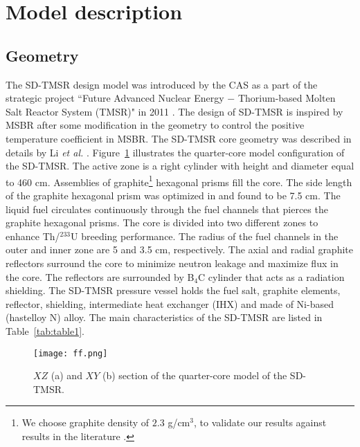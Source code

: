 \section{Model description}
\subsection{Geometry}
The \gls{SD-TMSR} design model was introduced by the \gls{CAS} as a part of  
the strategic project ``Future Advanced Nuclear Energy $-$ Thorium-based 
Molten Salt Reactor System (TMSR)" in 2011 
\cite{li_optimization_2018,jiang2012advanced,li2015analysis,li2017model}. The 
design of \gls{SD-TMSR} is inspired by \gls{MSBR} 
\cite{robertson_conceptual_1971} after some modification in the geometry to 
control the positive temperature coefficient in MSBR. The \gls{SD-TMSR} core 
geometry was described in details by Li \emph{et al.} 
\cite{li_optimization_2018}.
Figure~\ref{fig:ff} illustrates the quarter-core model configuration of the 
\gls{SD-TMSR}. The active zone is a right cylinder with height and diameter 
equal to 460 cm. Assemblies of graphite\footnote{We choose graphite density of 
$2.3$ g/cm$^3$, to validate our results against results in the literature 
\cite{li_optimization_2018,nuttin2005potential}.} hexagonal prisms fill the 
core. The side length of the graphite hexagonal prism was optimized in 
\cite{li_optimization_2018} and found to be 7.5 cm. The liquid fuel circulates 
continuously through the fuel channels that pierces the graphite hexagonal 
prisms. The core is divided into two different zones to enhance 
Th/$^{233}$U breeding performance. The radius of the fuel channels in the 
outer and inner zone are 5 and 3.5 cm, respectively. The axial and radial 
graphite reflectors surround the core to minimize neutron leakage and 
maximize flux in the core. The reflectors are surrounded by B${_4}$C cylinder 
that acts as a radiation shielding. The \gls{SD-TMSR} pressure vessel holds 
the fuel salt, graphite elements, reflector, shielding, intermediate heat 
exchanger (IHX) and made of Ni-based (hastelloy N) alloy. The main 
characteristics of the \gls{SD-TMSR} are listed in Table~\ref{tab:table1}.

\begin{figure} %
	\texttt{[image: ff.png]}
	\caption{$XZ$ (a) and $XY$ (b) section of the quarter-core model of the 
	SD-TMSR.}
	\label{fig:ff}
\end{figure}

